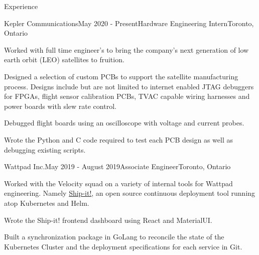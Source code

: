 \documentclass{resume} %
\begin{document}
\begin{rSection}{Experience}

\begin{rSubsection}{Kepler Communications}{May 2020 - Present}{Hardware
    Engineering Intern}{Toronto, Ontario}
\item Worked with full time engineer's to bring the company's next generation of
  low earth orbit (LEO) satellites to fruition.
\item Designed a selection of custom PCBs to support the satellite manufacturing
  process. Designs include but are not limited to internet enabled JTAG
  debuggers for FPGAs, flight sensor calibration PCBs, TVAC capable wiring
  harnesses and power boards with slew rate control.
\item Debugged flight boards using an oscilloscope with voltage
  and current probes.
\item Wrote the Python and C code required to test each PCB design as well as
  debugging existing scripts.
\end{rSubsection}


\begin{rSubsection}{Wattpad Inc.}{May 2019 - August 2019}{Associate
    Engineer}{Toronto, Ontario}
\item Worked with the Velocity squad on a variety of internal tools for Wattpad engineering.
  Namely \href{https://github.com/Wattpad/ship-it}{Ship-it!}, an open source continuous deployment tool running atop Kubernetes and
  Helm.
\item Wrote the Ship-it! frontend dashboard using React and MaterialUI.
\item Built a synchronization package in GoLang to reconcile the state of the
  Kubernetes Cluster and the deployment specifications for each service in Git.
\end{rSubsection}



\end{rSection}
\end{document}
